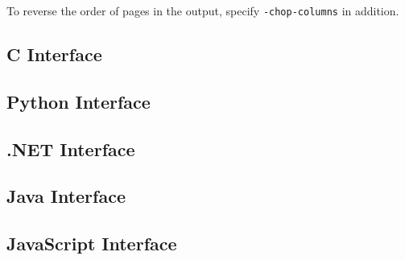 \documentclass{book}
\begin{document}
\noindent To reverse the order of pages in the output, specify \texttt{-chop-columns} in addition.

\begin{cpdflib}
\clearpage
\section*{C Interface}
\begin{small}\tt

\end{small}
\end{cpdflib}

\begin{pycpdflib}
\clearpage
\section*{Python Interface}
\begin{small}\tt

\end{small}
\end{pycpdflib}

\begin{dotnetcpdflib}
\clearpage
\section*{.NET Interface}
\begin{small}\tt

\end{small}
\end{dotnetcpdflib}

\begin{jcpdflib}
\clearpage
\section*{Java Interface}
\begin{small}\tt

\end{small}
\end{jcpdflib}

\begin{jscpdflib}
\clearpage
\section*{JavaScript Interface}
\begin{small}\tt

\end{small}
\end{jscpdflib}
\end{document}
